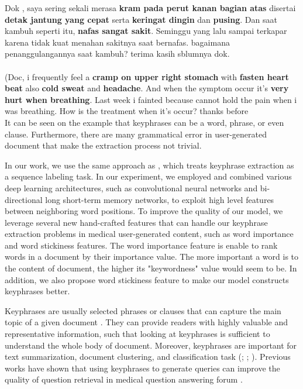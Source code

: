 	Dok , saya sering sekali merasa \textbf{kram pada perut kanan bagian atas} disertai \textbf{detak jantung yang cepat} serta \textbf{keringat dingin} dan \textbf{pusing}. Dan saat kambuh seperti itu, \textbf{nafas sangat sakit}. Seminggu yang lalu sampai terkapar karena tidak kuat menahan sakitnya saat bernafas. bagaimana penanggulangannya saat kambuh? terima kasih sblumnya dok. \\\\
	(Doc, i frequently feel a \textbf{cramp on upper right stomach} with \textbf{fasten heart beat} also \textbf{cold sweat} and \textbf{headache}. And when the symptom occur it's \textbf{very hurt when breathing}. Last week i fainted because cannot hold the pain when i was breathing. How is the treatment when it's occur? thanks before \\

It can be seen on the example that keyphrases can be a word, phrase, or even clause. Furthermore, there are many grammatical error in user-generated document that make the extraction process not trivial.

In our work, we use the same approach as \cite{cao2010automatically}, which treats keyphrase extraction as a sequence labeling task. In our experiment, we employed and combined various deep learning architectures, such as convolutional neural networks and bi-directional long short-term memory networks, to exploit high level features between neighboring word positions. To improve the quality of our model, we leverage several new hand-crafted features that can handle our keyphrase extraction problems in medical user-generated content, such as word importance and word stickiness features. The word importance feature is enable to rank words in a document by their importance value. The more important a word is to the content of document, the higher its "keywordness" value would seem to be. In addition, we also propose word stickiness feature to make our model constructs keyphrases better. 

\iffalse
Keyphrases are usually selected phrases or clauses that can capture the main topic of a given document \cite{turney2000learning}. They can provide readers with highly valuable and representative information, such that looking at keyphrases is sufficient to understand the whole body of document. Moreover, keyphrases are important for text summarization, document clustering, and classification task (\cite{classDocumentEkp1}; \cite{qaEkp}; \cite{gong2009improving}). Previous works have shown that using keyphrases to generate queries can improve the quality of question retrieval in medical question answering forum \cite{cao2010automatically}.


